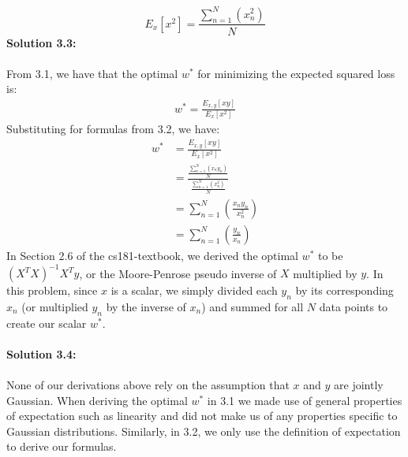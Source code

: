 \documentclass[submit]{harvardml}
\begin{document}
\[E_{x}[x^2] = \frac{\sum_{n=1}^N(x_n^2)}{N}\]
\textbf{Solution 3.3:} \\ \\
From 3.1, we have that the optimal $w^*$ for minimizing the expected squared loss is:
\begin{align*}
    w^* = \frac{E_{x,y}[xy]}{E_{x}[x^2]}
\end{align*}
Substituting for formulas from 3.2, we have:
\begin{align*}
    w^* &= \frac{E_{x,y}[xy]}{E_{x}[x^2]} \\
    &= \frac{\frac{\sum_{n=1}^N(x_ny_n)}{N}}{\frac{\sum_{n=1}^N(x_n^2)}{N}} \\
    &= \sum_{n=1}^N(\frac{x_ny_n}{x_n^2})
    \\
    &= \sum_{n=1}^N(\frac{y_n}{x_n})
\end{align*}
In Section 2.6 of the cs181-textbook, we derived the optimal $w^*$ to be $(X^TX)^{-1}X^Ty$, or the Moore-Penrose pseudo inverse of $X$ multiplied by $y$. In this problem, since $x$ is a scalar, we simply divided each $y_n$ by its corresponding $x_n$ (or multiplied $y_n$ by the inverse of $x_n$) and summed for all $N$ data points to create our scalar $w^*$. \\ \\
\textbf{Solution 3.4:} \\ \\
None of our derivations above rely on the assumption that $x$ and $y$ are jointly Gaussian. When deriving the optimal $w^*$ in 3.1 we made use of general properties of expectation such as linearity and did not make us of any properties specific to Gaussian distributions. Similarly, in 3.2, we only use the definition of expectation to derive our formulas.
\newpage
\end{document}
